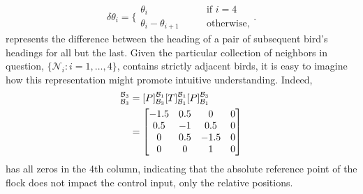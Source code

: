 \documentclass{homework}
\begin{document}
\begin{equation}
    \delta\theta_i = \biggl\{\begin{array}{ll}
            \theta_i &\qquad \text{if } i = 4 \\
            \theta_i - \theta_{i + 1} &\qquad \text{otherwise,}
    \end{array}
    \biggr.
\end{equation}
represents the difference between the heading of a pair of subsequent
bird's headings for all but the last. Given the particular
collection of neighbors in question, $\{\mathcal{N}_i: i=1,\dots,4\}$,
contains strictly adjacent birds,
it is easy to imagine how this representation might promote
intuitive understanding. Indeed,
\begin{align}
    [T]_{\basis_3}^{\basis_3} &= [P]_{\basis_3}^{\basis_1}
            [T]_{\basis_1}^{\basis_1}
            [P]_{\basis_1}^{\basis_3} \\
        &= \begin{bmatrix}
            -1.5 & 0.5 & 0 & 0 \\
            0.5 & -1 & 0.5 & 0 \\
            0 & 0.5 & -1.5 & 0 \\
            0 & 0 & 1 & 0 \\
        \end{bmatrix}
\end{align}
has all zeros in the 4th column, indicating that the absolute
reference point of the flock does not impact the control input,
only the relative positions.


        
        



\end{document}
